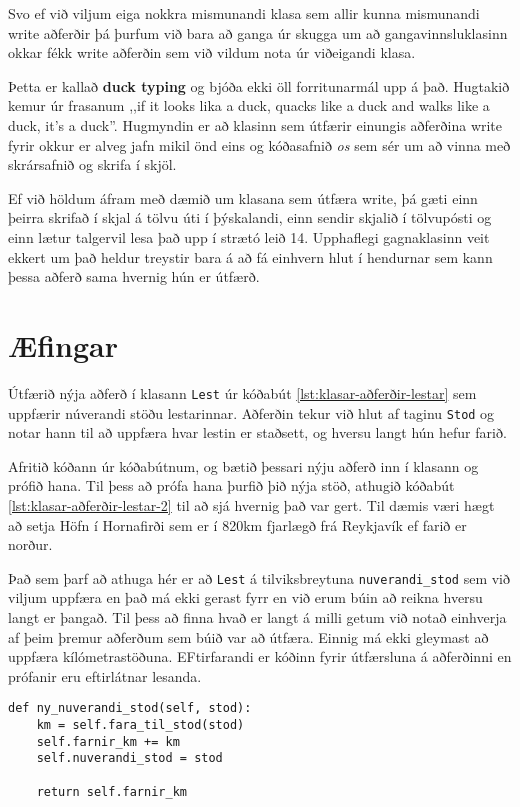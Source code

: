 Svo ef við viljum eiga nokkra mismunandi klasa sem allir kunna mismunandi write aðferðir þá þurfum við bara að ganga úr skugga um að gangavinnsluklasinn okkar fékk write aðferðin sem við vildum nota úr viðeigandi klasa.

Þetta er kallað \textbf{duck typing} og bjóða ekki öll forritunarmál upp á það.
Hugtakið kemur úr frasanum ,,if it looks lika a duck, quacks like a duck and walks like a duck, it's a duck''.
Hugmyndin er að klasinn sem útfærir einungis aðferðina write fyrir okkur er alveg jafn mikil önd eins og kóðasafnið \textit{os} sem sér um að vinna með skrársafnið og skrifa í skjöl.

Ef við höldum áfram með dæmið um klasana sem útfæra write, þá gæti einn þeirra skrifað í skjal á tölvu úti í þýskalandi, einn sendir skjalið í tölvupósti og einn lætur talgervil lesa það upp í strætó leið 14.
Upphaflegi gagnaklasinn veit ekkert um það heldur treystir bara á að fá einhvern hlut í hendurnar sem kann þessa aðferð sama hvernig hún er útfærð.

\newpage
\section{Æfingar}
\begin{exercise}\label{kla1}
Útfærið nýja aðferð í klasann \texttt{Lest} úr kóðabút \ref{lst:klasar-aðferðir-lestar} sem uppfærir núverandi stöðu lestarinnar.
Aðferðin tekur við hlut af taginu \texttt{Stod} og notar hann til að uppfæra hvar lestin er staðsett, og hversu langt hún hefur farið.

Afritið kóðann úr kóðabútnum, og bætið þessari nýju aðferð inn í klasann og prófið hana.
Til þess að prófa hana þurfið þið nýja stöð, athugið kóðabút \ref{lst:klasar-aðferðir-lestar-2} til að sjá hvernig það var gert.
Til dæmis væri hægt að setja Höfn í Hornafirði sem er í 820km fjarlægð frá Reykjavík ef farið er norður.
\end{exercise}
\begin{Answer}[ref={kla1}]
Það sem þarf að athuga hér er að \texttt{Lest} á tilviksbreytuna \texttt{nuverandi\_stod} sem við viljum uppfæra en það má ekki gerast fyrr en við erum búin að reikna hversu langt er þangað.
Til þess að finna hvað er langt á milli getum við notað einhverja af þeim þremur aðferðum sem búið var að útfæra.
Einnig má ekki gleymast að uppfæra kílómetrastöðuna.
EFtirfarandi er kóðinn fyrir útfærsluna á aðferðinni en prófanir eru eftirlátnar lesanda.
	\begin{lstlisting}
def ny_nuverandi_stod(self, stod):
	km = self.fara_til_stod(stod)
	self.farnir_km += km
	self.nuverandi_stod = stod

	return self.farnir_km\end{lstlisting}
\end{Answer}

